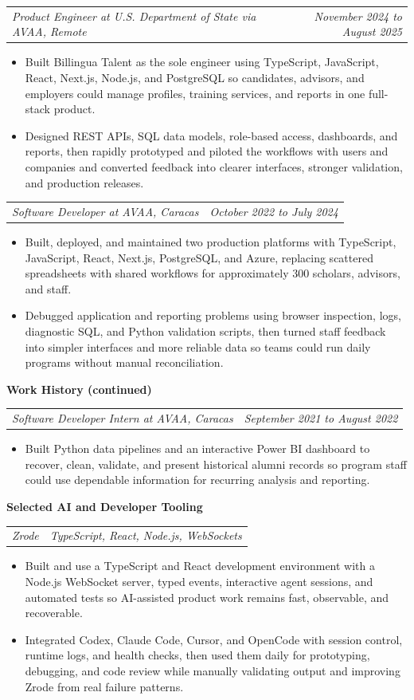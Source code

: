 \documentclass[10pt,letterpaper]{article}
\makeatletter
\newcommand{\bodyfont}{\fontsize{10.5}{15.75}\selectfont}
\newcommand{\sectiontitle}[1]{%
  \vspace{6pt}
  {\bodyfont\textbf{#1}}\par
  \nopagebreak[4]
  \vspace{4pt}
}
\newcommand{\roleline}[2]{%
  \begin{tabularx}{\textwidth}{@{}Xr@{}}
    \bodyfont\textit{#1} & \bodyfont\textit{#2}
  \end{tabularx}
  \nopagebreak[4]
  \vspace{1pt}
}
\makeatother
\begin{document}
\vspace{3pt}
\roleline{Product Engineer at U.S. Department of State via AVAA, Remote}{November 2024 to August 2025}
\begin{itemize}
  \item Built Billingua Talent as the sole engineer using TypeScript, JavaScript, React, Next.js, Node.js, and PostgreSQL so candidates, advisors, and employers could manage profiles, training services, and reports in one full-stack product.
  \item Designed REST APIs, SQL data models, role-based access, dashboards, and reports, then rapidly prototyped and piloted the workflows with users and companies and converted feedback into clearer interfaces, stronger validation, and production releases.
\end{itemize}

\vspace{3pt}
\roleline{Software Developer at AVAA, Caracas}{October 2022 to July 2024}
\begin{itemize}
  \item Built, deployed, and maintained two production platforms with TypeScript, JavaScript, React, Next.js, PostgreSQL, and Azure, replacing scattered spreadsheets with shared workflows for approximately 300 scholars, advisors, and staff.
  \item Debugged application and reporting problems using browser inspection, logs, diagnostic SQL, and Python validation scripts, then turned staff feedback into simpler interfaces and more reliable data so teams could run daily programs without manual reconciliation.
\end{itemize}

\newpage
\sectiontitle{Work History (continued)}
\roleline{Software Developer Intern at AVAA, Caracas}{September 2021 to August 2022}
\begin{itemize}
  \item Built Python data pipelines and an interactive Power BI dashboard to recover, clean, validate, and present historical alumni records so program staff could use dependable information for recurring analysis and reporting.
\end{itemize}

\sectiontitle{Selected AI and Developer Tooling}

\roleline{Zrode}{TypeScript, React, Node.js, WebSockets}
\begin{itemize}
  \item Built and use a TypeScript and React development environment with a Node.js WebSocket server, typed events, interactive agent sessions, and automated tests so AI-assisted product work remains fast, observable, and recoverable.
  \item Integrated Codex, Claude Code, Cursor, and OpenCode with session control, runtime logs, and health checks, then used them daily for prototyping, debugging, and code review while manually validating output and improving Zrode from real failure patterns.
\end{itemize}
\end{document}
